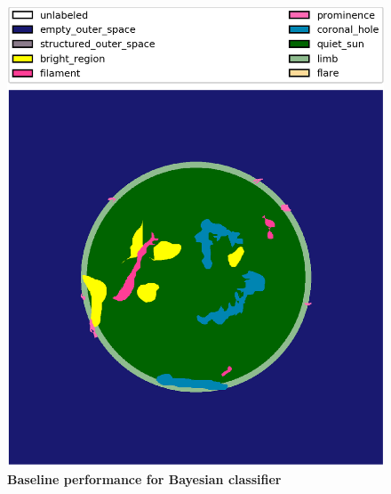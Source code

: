 \documentclass[twoside]{report}
\begin{document}
\begin{figure}[ht]
\begin{center}
    \includegraphics[scale=0.2]{base_rf_gold}
    \caption{{\bf Baseline performance for Bayesian classifier}}
    \label{fig:base-bayesian}
 \end{center}
\end{figure}
\end{document}

